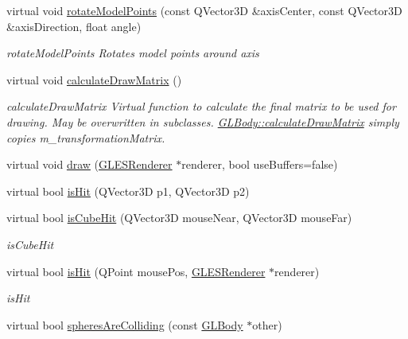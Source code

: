 \begin{DoxyCompactItemize}
virtual void \mbox{\hyperlink{class_g_l_body_a2bcb327029d699431bcb8ae51d3c57fb}{rotate\+Model\+Points}} (const Q\+Vector3D \&axis\+Center, const Q\+Vector3D \&axis\+Direction, float angle)
\begin{DoxyCompactList}\small\item\em rotate\+Model\+Points Rotates model points around axis \end{DoxyCompactList}\item 
\mbox{\label{class_g_l_body_af69c1be811d9da78c2cf9d65deb83b5d}} 
virtual void \mbox{\hyperlink{class_g_l_body_af69c1be811d9da78c2cf9d65deb83b5d}{calculate\+Draw\+Matrix}} ()
\begin{DoxyCompactList}\small\item\em calculate\+Draw\+Matrix Virtual function to calculate the final matrix to be used for drawing. May be overwritten in subclasses. \mbox{\hyperlink{class_g_l_body_af69c1be811d9da78c2cf9d65deb83b5d}{G\+L\+Body\+::calculate\+Draw\+Matrix}} simply copies m\+\_\+transformation\+Matrix. \end{DoxyCompactList}\item 
virtual void \mbox{\hyperlink{class_g_l_body_aaeb47c0a8cfc36caed81fc139c42ddfc}{draw}} (\mbox{\hyperlink{class_g_l_e_s_renderer}{G\+L\+E\+S\+Renderer}} $\ast$renderer, bool use\+Buffers=false)
\item 
virtual bool \mbox{\hyperlink{class_g_l_body_abe64b649f2b2ec09b2876d6382258e13}{is\+Hit}} (Q\+Vector3D p1, Q\+Vector3D p2)
\item 
virtual bool \mbox{\hyperlink{class_g_l_body_a565ad6592f00bd28942408a1a8ecd669}{is\+Cube\+Hit}} (Q\+Vector3D mouse\+Near, Q\+Vector3D mouse\+Far)
\begin{DoxyCompactList}\small\item\em is\+Cube\+Hit \end{DoxyCompactList}\item 
virtual bool \mbox{\hyperlink{class_g_l_body_ad6855369ac46247ffe0709731e889d23}{is\+Hit}} (Q\+Point mouse\+Pos, \mbox{\hyperlink{class_g_l_e_s_renderer}{G\+L\+E\+S\+Renderer}} $\ast$renderer)
\begin{DoxyCompactList}\small\item\em is\+Hit \end{DoxyCompactList}\item 
virtual bool \mbox{\hyperlink{class_g_l_body_ab34746fd9ba6a8a0ba0a8e2b04e0fad3}{spheres\+Are\+Colliding}} (const \mbox{\hyperlink{class_g_l_body}{G\+L\+Body}} $\ast$other)

\end{DoxyCompactItemize}
